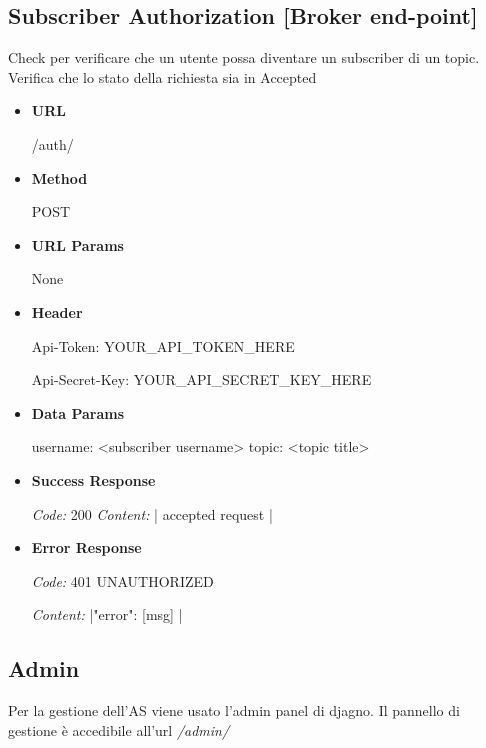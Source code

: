 \subsection{Subscriber Authorization [Broker end-point]}
Check per verificare che un utente possa diventare un subscriber di un topic.
Verifica che lo stato della richiesta sia in Accepted
\begin{itemize}
\item \textbf{URL} \par
    /auth/
\item \textbf{Method} \par
    POST
\item \textbf{URL Params} \par
    None
\item \textbf{Header} \par
     Api-Token: YOUR\_API\_TOKEN\_HERE \par
     Api-Secret-Key: YOUR\_API\_SECRET\_KEY\_HERE
\item \textbf{Data Params} \par
    username: <subscriber username>
    topic: <topic title>
\item \textbf{Success Response} \par
    \emph{Code:} 200
    \emph{Content:} | {accepted request} |
\item \textbf{Error Response} \par
    \emph{Code:} 401 UNAUTHORIZED \par
    \emph{Content:} |{"error": [msg] }|
\end{itemize}

\subsection{Admin}
Per la gestione dell'AS viene usato l'admin panel di djagno.
Il pannello di gestione è accedibile all'url \textit{/admin/}

